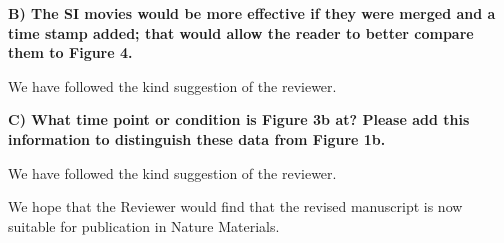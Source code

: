 \documentclass[11pt]{article}
\begin{document}
\singlespacing

{\bf
B) The SI movies would be more effective if they were merged and a time stamp added; that would allow the reader to better compare them to Figure 4.
}


\bigskip
\doublespacing
We have followed the kind suggestion of the reviewer. 


\vspace{1em}

\singlespacing

{\bf
C) What time point or condition is Figure 3b at? Please add this information to distinguish these data from Figure 1b.
}



\bigskip
\doublespacing

We have followed the kind suggestion of the reviewer. 



We hope that the Reviewer would find that the revised manuscript is now suitable for publication in Nature Materials. 
\end{document}
